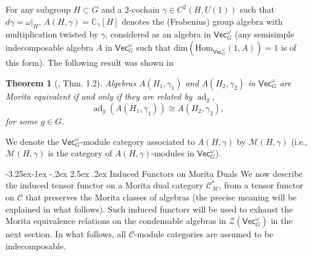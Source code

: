 \documentclass[aps,twocolumn,prx,floatfix,preprintnumbers, nofootinbib,10pt]{revtex4-2}
\makeatletter
\numberwithin{equation}{section}
\newtheorem{theorem}{Theorem}[section]
\theoremstyle{definition}
\newcommand{\be}{\begin{equation}}
\newcommand{\ee}{\end{equation}}
\newcommand{\nn}{\nonumber}
\newcommand{\lb}{\left(}
\newcommand{\rb}{\right)}
\newcommand{\wt}{\widetilde}
\newcommand{\ot}{\otimes}
\newcommand{\cC}{\mathcal{C}}
\newcommand{\cM}{\mathcal{M}}
\newcommand{\cZ}{\mathcal{Z}}
\newcommand{\Hom}{\text{Hom}}
\renewcommand{\Vec}{\mathsf{Vec}}
\renewcommand{\dim}{\text{dim}}
\newcommand{\Vect}{\mathsf{Vec}}
\renewcommand\subsubsection{\@startsection{subsubsection}{3}{\z@}%
                                     {-3.25ex\@plus -1ex \@minus -.2ex}%
                                     {2.5ex \@plus .2ex}%
                                     {\centering\itshape\bfseries\small}}
\def\ad{\mathop{\mathrm{ad}}\nolimits}
\makeatother
\begin{document}
For any subgroup $H\subset G$ and a 2-cochain $\gamma\in C^2(H, U(1))$ such that $d\gamma = \omega|_H$, $A(H,\gamma) = \mathbb{C}_{\gamma}[H]$ denotes the (Frobenius) group algebra with multiplication twisted by $\gamma$, considered as an algebra in $\Vec_G^\omega$ (any semisimple indecomposable algebra $A$ in $\Vec_G^\omega$ such that $\dim\lb \Hom_{\Vec_G^\omega}(1,A) \rb=1$ is of this form).
The following result was shown in \cite{Natale2017} 
\begin{theorem}[\cite{Natale2017}, Thm. 1.2]
\label{thm:Natale_MorEquivAlg}
    Algebras $A(H_1,\gamma_1)$ and $A(H_2,\gamma_2)$ in $\Vec_G^\omega$ are Morita equivalent if and only if they are related by $\ad_g$,
\be
    \ad_g(A(H_1,\gamma_1))\cong A(H_2,\gamma_2),
\ee
for some $g\in G$.
\end{theorem}
We denote the $\Vec_G^\omega$-module category associated to $A(H,\gamma)$ by $\cM(H,\gamma)$ (i.e., $\cM(H, \gamma)$ is the category of $A(H, \gamma)$-modules in $\Vec_G^\omega$).




\subsubsection{Induced Functors on Morita Duals}
\label{sec:induced_functor_on_Morita_dual}
We now describe the induced tensor functor on a Morita dual category $\cC_\cM^*$, from a tensor functor on $\cC$ that preserves the Morita classes of algebras (the precise meaning will be explained in what follows). Such induced functors will be used to exhaust the Morita equivalence relations on the condensable algebras in $\cZ(\Vec_G^\omega)$ in the next section. In what follows, all $\cC$-module categories are assumed to be indecomposable.
\end{document}
